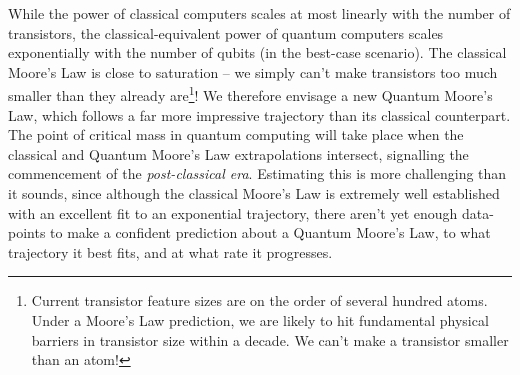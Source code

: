 


While the power of classical computers scales at most linearly with the number of transistors, the classical-equivalent power of quantum computers scales exponentially with the number of qubits (in the best-case scenario). The classical Moore's Law is close to saturation -- we simply can't make transistors too much smaller than they already are\footnote{Current transistor feature sizes are on the order of several hundred atoms. Under a Moore's Law prediction, we are likely to hit fundamental physical barriers in transistor size within a decade. We can't make a transistor smaller than an atom!}! We therefore envisage a new Quantum Moore's Law, which follows a far more impressive trajectory than its classical counterpart. The point of critical mass in quantum computing will take place when the classical and Quantum Moore's Law extrapolations intersect, signalling the commencement of the \textit{post-classical era}. Estimating this is more challenging than it sounds, since although the classical Moore's Law is extremely well established with an excellent fit to an exponential trajectory, there aren't yet enough data-points to make a confident prediction about a Quantum Moore's Law, to what trajectory it best fits, and at what rate it progresses.

